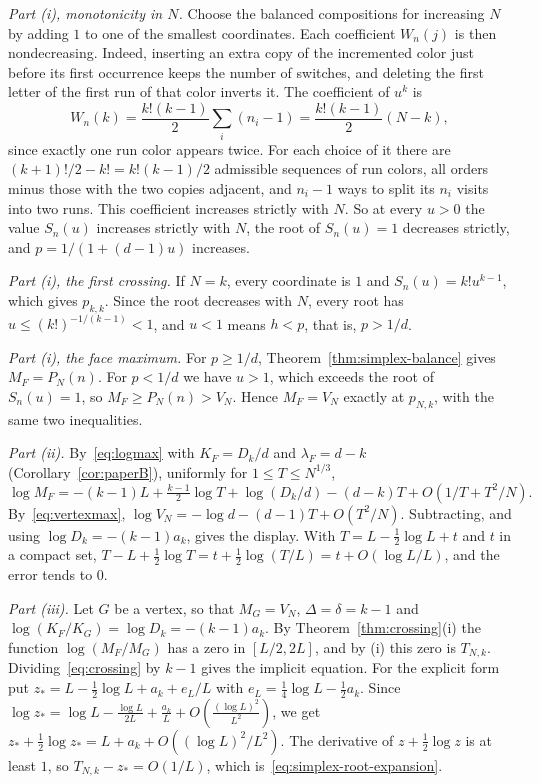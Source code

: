 \emph{Part (i), monotonicity in $N$.} Choose the balanced compositions for increasing
$N$ by adding $1$ to one of the smallest coordinates. Each coefficient $W_n(j)$
is then nondecreasing. Indeed, inserting an extra copy of the incremented color just before
its first occurrence keeps the number of switches, and deleting the first letter of the first
run of that color inverts it. The coefficient of $u^k$ is
\[
W_n(k)=\frac{k!(k-1)}2\sum_i(n_i-1)=\frac{k!(k-1)}2(N-k),
\]
since exactly one run color appears twice. For each choice of it there are
$(k+1)!/2-k!=k!(k-1)/2$ admissible sequences of run colors, all orders minus those with the
two copies adjacent, and $n_i-1$ ways to split its $n_i$ visits into two runs. This coefficient
increases strictly with $N$. So at every $u>0$ the value $S_n(u)$ increases strictly with $N$,
the root of $S_n(u)=1$ decreases strictly, and $p=1/(1+(d-1)u)$ increases.

\emph{Part (i), the first crossing.} If $N=k$, every coordinate is $1$ and
$S_n(u)=k!u^{k-1}$, which gives $p_{k,k}$. Since the root decreases with $N$,
every root has $u\le(k!)^{-1/(k-1)}<1$, and $u<1$ means $h<p$, that is,
$p>1/d$.

\emph{Part (i), the face maximum.} For $p\ge1/d$, Theorem~\ref{thm:simplex-balance} gives
$M_F=P_N(n)$. For $p<1/d$ we have $u>1$, which exceeds the root of $S_n(u)=1$, so
$M_F\ge P_N(n)>V_N$. Hence $M_F=V_N$ exactly at $p_{N,k}$, with the same two inequalities.

\emph{Part (ii).} By~\eqref{eq:logmax} with $K_F=D_k/d$ and $\lambda_F=d-k$
(Corollary~\ref{cor:paperB}), uniformly for $1\le T\le N^{1/3}$,
\[
\log M_F=-(k-1)L+\tfrac{k-1}2\log T+\log(D_k/d)-(d-k)T+O(1/T+T^2/N).
\]
By~\eqref{eq:vertexmax}, $\log V_N=-\log d-(d-1)T+O(T^2/N)$. Subtracting, and using
$\log D_k=-(k-1)a_k$, gives the display. With $T=L-\frac12\log L+t$ and $t$ in a compact set,
$T-L+\frac12\log T=t+\frac12\log(T/L)=t+O(\log L/L)$, and the error tends to $0$.

\emph{Part (iii).} Let $G$ be a vertex, so that $M_G=V_N$, $\Delta=\delta=k-1$ and
$\log(K_F/K_G)=\log D_k=-(k-1)a_k$. By Theorem~\ref{thm:crossing}(i) the function
$\log(M_F/M_G)$ has a zero in $[L/2,2L]$, and by (i) this zero is $T_{N,k}$.
Dividing~\eqref{eq:crossing} by $k-1$ gives the implicit equation. For the explicit form put
$z_*=L-\frac12\log L+a_k+e_L/L$ with $e_L=\frac14\log L-\frac12a_k$. Since
$\log z_*=\log L-\frac{\log L}{2L}+\frac{a_k}L+O(\frac{(\log L)^2}{L^2})$, we get
$z_*+\frac12\log z_*=L+a_k+O((\log L)^2/L^2)$. The derivative of $z+\frac12\log z$ is at
least $1$, so $T_{N,k}-z_*=O(1/L)$, which is~\eqref{eq:simplex-root-expansion}.

